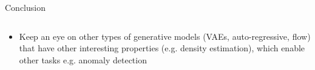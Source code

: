 \documentclass[8pt,xcolor=table,aspectratio=169]{beamer}
\begin{document}
\begin{frame}{Conclusion}
\begin{columns}
\begin{column}{0.5\textwidth}
\begin{itemize}
\vspace{2em}

\item Keep an eye on other types of generative models (VAEs, auto-regressive, flow) that have other interesting properties (e.g. density estimation), which enable other tasks e.g. anomaly detection

\end{itemize}

\end{column}
\end{columns}

\end{frame}
\end{document}
